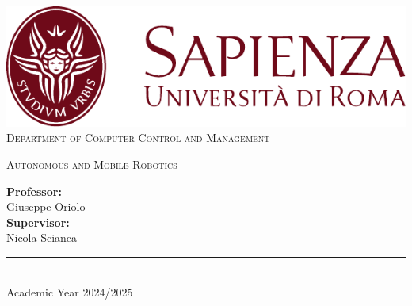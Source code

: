 \begin{titlepage}
	\centering
    \vspace*{0.5 cm}
    \includegraphics[scale = 0.75]{figures/SapienzaLogo.pdf}\\[1.0 cm]	%

    \vspace*{-0.4cm}
    \textsc{\large Department of Computer Control and Management}\\[2.0 cm]	%
    \vspace*{1cm}

    { \fontsize{20.74pt}{18.5pt}\selectfont\bfseries \thetitle \par } %

    \vspace*{0.25cm}
    \textsc{\Large Autonomous and Mobile Robotics}\\[0.5 cm] %

    \vspace*{2.6cm}
	\begin{minipage}{0.4\textwidth}
		\begin{flushleft} \large
			\textbf{Professor:}\\
			Giuseppe Oriolo\\[0.5cm]
			\textbf{Supervisor:}\\
			Nicola Scianca
		\end{flushleft}
	\end{minipage}
	\hfill
	\begin{minipage}{0.4\textwidth}
		\begin{flushleft} \large
			\theauthor
		\end{flushleft}
	\end{minipage}

    \vspace{3cm}

    \rule{\linewidth}{0.2 mm} \\[0.3 cm]
    \vspace*{-0.2cm}
    Academic Year 2024/2025
\end{titlepage}
